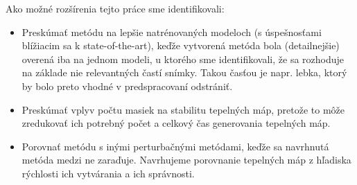 Ako možné rozšírenia tejto práce sme identifikovali:

\begin{itemize}
    \item Preskúmať metódu na lepšie natrénovaných modeloch (s úspešnosťami blížiacim sa k state-of-the-art), keďže vytvorená metóda bola (detailnejšie) overená iba na jednom modeli, u ktorého sme identifikovali, že sa rozhoduje na základe nie relevantných častí snímky. Takou časťou je napr. lebka, ktorý by bolo preto vhodné v predspracovaní odstrániť.
    \item Preskúmať vplyv počtu masiek na stabilitu tepelných máp, pretože to môže zredukovať ich potrebný počet a celkový čas generovania tepelných máp.
    \item Porovnať metódu s inými perturbačnými metódami, keďže sa navrhnutá metóda medzi ne zaraďuje. Navrhujeme porovnanie tepelných máp z hľadiska rýchlosti ich vytvárania a ich správnosti.
\end{itemize}

